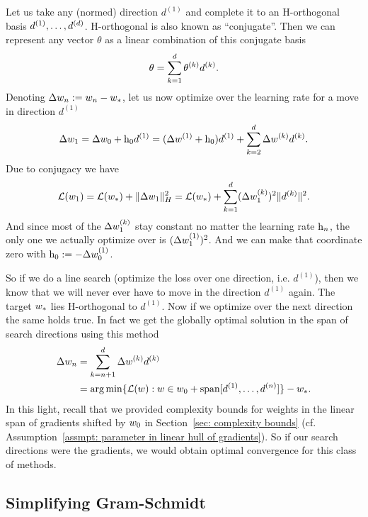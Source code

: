 Let us take any (normed) direction \(d^{(1)}\) and complete it to an H-orthogonal
basis \(d^{(1)},\dots,d^{(d)}\). H-orthogonal is also known as
``conjugate''. Then we can represent any vector \(\theta\) as a linear
combination of this conjugate basis
\begin{align*}
	\theta = \sum_{k=1}^d \theta^{(k)} d^{(k)}.
\end{align*}
Denoting \(\Delta w_n := w_n -w_*\), let us now optimize over
the learning rate for a move in direction \(d^{(1)}\)
\begin{align*}
	\Delta w_{1} = \Delta w_0 + \text{h}_0 d^{(1)}
	= (\Delta w^{(1)} + \text{h}_0)d^{(1)}
	+ \sum_{k=2}^d \Delta w^{(k)} d^{(k)}.
\end{align*}
Due to conjugacy we have
\begin{align*}
	\mathcal{L}(w_{1})
	= \mathcal{L}(w_*) + \|\Delta w_{1}\|_H^2
	= \mathcal{L}(w_*) + \sum_{k=1}^{d} (\Delta w_{1}^{(k)})^2\|d^{(k)}\|^2.
\end{align*}
And since most of the \(\Delta w^{(k)}_{1}\) stay constant no matter the
learning rate \(\text{h}_n\), the only one we actually optimize over is
\((\Delta w^{(1)}_{1})^2\).
And we can make that coordinate zero with \(\text{h}_0 :=-\Delta w_0^{(1)}\).

So if we do a line search (optimize the loss over one direction, i.e. \(d^{(1)}\)),
then we know that we will never ever have to move in the direction \(d^{(1)}\)
again. The target \(w_*\) lies H-orthogonal to \(d^{(1)}\). Now if we
optimize over the next direction the same holds true. In fact we get the globally
optimal solution in the span of search directions using this method 
\begin{align*}
	\Delta w_n &= \sum_{k=n+1}^d\Delta w^{(k)} d^{(k)}\\
	&= \arg\min \{
		\mathcal{L}(w) : w \in w_0 + \text{span}[d^{(1)},\dots, d^{(n)}]
	\} - w_*.
\end{align*}
In this light, recall that we provided complexity bounds for weights in the
linear span of gradients shifted by \(w_0\) in Section~\ref{sec: complexity bounds}
(cf. Assumption~\ref{assmpt: parameter in linear hull of gradients}). So if our
search directions were the gradients, we would obtain optimal convergence for
this class of methods.

\subsection{Simplifying Gram-Schmidt}

